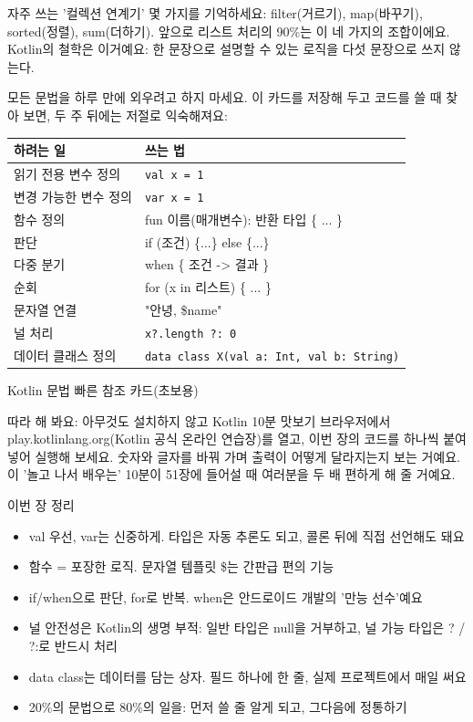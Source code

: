 자주 쓰는 '컬렉션 연계기' 몇 가지를 기억하세요: filter(거르기), map(바꾸기), sorted(정렬), sum(더하기). 앞으로 리스트 처리의 90\%는 이 네 가지의 조합이에요. Kotlin의 철학은 이거예요: 한 문장으로 설명할 수 있는 로직을 다섯 문장으로 쓰지 않는다.


모든 문법을 하루 만에 외우려고 하지 마세요. 이 카드를 저장해 두고 코드를 쓸 때 찾아 보면, 두 주 뒤에는 저절로 익숙해져요:

\begin{center}
\begin{tabularx}{\linewidth}{|X|X|}
\hline
\textbf{하려는 일} & \textbf{쓰는 법} \tabularnewline
\hline
읽기 전용 변수 정의 & \texttt{val x = 1} \tabularnewline
변경 가능한 변수 정의 & \texttt{var x = 1} \tabularnewline
함수 정의 & fun 이름(매개변수): 반환 타입 \{ ... \} \tabularnewline
판단 & if (조건) \{...\} else \{...\} \tabularnewline
다중 분기 & when \{ 조건 -> 결과 \} \tabularnewline
순회 & for (x in 리스트) \{ ... \} \tabularnewline
문자열 연결 & "안녕, \$name" \tabularnewline
널 처리 & \texttt{x?.\allowbreak length ?: 0} \tabularnewline
데이터 클래스 정의 & \texttt{data class X(val a: Int, val b: String)} \tabularnewline
\hline
\end{tabularx}
\end{center}

\begin{center}\small\color{gray}Kotlin 문법 빠른 참조 카드(초보용)\end{center}

\begin{tcbpractice}{따라 해 봐요: 아무것도 설치하지 않고 Kotlin 10분 맛보기}
브라우저에서 play.kotlinlang.org(Kotlin 공식 온라인 연습장)를 열고, 이번 장의 코드를 하나씩 붙여 넣어 실행해 보세요. 숫자와 글자를 바꿔 가며 출력이 어떻게 달라지는지 보는 거예요. 이 '놀고 나서 배우는' 10분이 51장에 들어설 때 여러분을 두 배 편하게 해 줄 거예요.

\end{tcbpractice}

\begin{tcbsummary}{이번 장 정리}
\begin{itemize}
  \item val 우선, var는 신중하게. 타입은 자동 추론도 되고, 콜론 뒤에 직접 선언해도 돼요
  \item 함수 = 포장한 로직. 문자열 템플릿 \$는 간판급 편의 기능
  \item if/when으로 판단, for로 반복. when은 안드로이드 개발의 '만능 선수'예요
  \item 널 안전성은 Kotlin의 생명 부적: 일반 타입은 null을 거부하고, 널 가능 타입은 ? / ?:로 반드시 처리
  \item data class는 데이터를 담는 상자. 필드 하나에 한 줄, 실제 프로젝트에서 매일 써요
  \item 20\%의 문법으로 80\%의 일을: 먼저 쓸 줄 알게 되고, 그다음에 정통하기
\end{itemize}

\end{tcbsummary}
